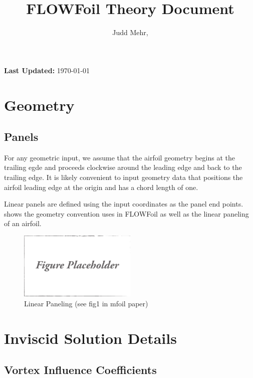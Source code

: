 \documentclass[]{article}
\title{FLOWFoil Theory Document}
\author{Judd Mehr, }
\date{}
\begin{document}
\maketitle

\noindent \textbf{Last Updated:} \mydate\today

\section{Geometry}
\label{sec:geometry}

\subsection{Panels}
\label{ssec:panels}

For any geometric input, we assume that the airfoil geometry begins at the trailing egde and proceeds clockwise around the leading edge and back to the trailing edge.
It is likely convenient to input geometry data that positions the airfoil leading edge at the origin and has a chord length of one.

Linear panels are defined using the input coordinates as the panel end points.
 shows the geometry convention uses in FLOWFoil as well as the linear paneling of an airfoil.

\begin{figure}[h]
	\centering
	\includegraphics[width=0.5\textwidth]{draft}
	\caption{Linear Paneling (see fig1 in mfoil paper)}
	\label{fig:linearpanels}
\end{figure}


\section{Inviscid Solution Details}
\label{sec:inviscidsolution}


\subsection{Vortex Influence Coefficients}
\label{ssec:vortexinfluencecoefficients}
\end{document}
